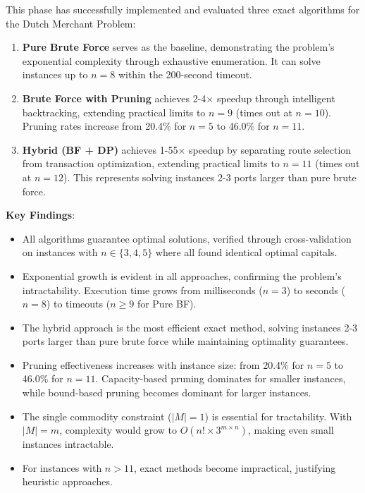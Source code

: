 \documentclass[12pt]{article}
\begin{document}
This phase has successfully implemented and evaluated three exact algorithms for the Dutch Merchant Problem:

\begin{enumerate}
    \item \textbf{Pure Brute Force} serves as the baseline, demonstrating the problem's exponential complexity through exhaustive enumeration. It can solve instances up to $n=8$ within the 200-second timeout.
    
    \item \textbf{Brute Force with Pruning} achieves 2-4$\times$ speedup through intelligent backtracking, extending practical limits to $n=9$ (times out at $n=10$). Pruning rates increase from 20.4\% for $n=5$ to 46.0\% for $n=11$.
    
    \item \textbf{Hybrid (BF + DP)} achieves 1-55$\times$ speedup by separating route selection from transaction optimization, extending practical limits to $n=11$ (times out at $n=12$). This represents solving instances 2-3 ports larger than pure brute force.
\end{enumerate}

\textbf{Key Findings}:
\begin{itemize}
    \item All algorithms guarantee optimal solutions, verified through cross-validation on instances with $n \in \{3, 4, 5\}$ where all found identical optimal capitals.
    \item Exponential growth is evident in all approaches, confirming the problem's intractability. Execution time grows from milliseconds ($n=3$) to seconds ($n=8$) to timeouts ($n \geq 9$ for Pure BF).
    \item The hybrid approach is the most efficient exact method, solving instances 2-3 ports larger than pure brute force while maintaining optimality guarantees.
    \item Pruning effectiveness increases with instance size: from 20.4\% for $n=5$ to 46.0\% for $n=11$. Capacity-based pruning dominates for smaller instances, while bound-based pruning becomes dominant for larger instances.
    \item The single commodity constraint ($|M| = 1$) is essential for tractability. With $|M| = m$, complexity would grow to $O(n! \times 3^{m \times n})$, making even small instances intractable.
    \item For instances with $n > 11$, exact methods become impractical, justifying heuristic approaches.
\end{itemize}
\end{document}
